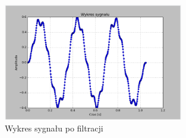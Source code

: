 \documentclass{article}
\begin{document}
{{            \begin{figure}[h!]
                \centering
                \includegraphics[width=0.7\textwidth]{img/fil14.png}
                \caption{Wykres sygnału po filtracji}
            \end{figure}
            \FloatBarrier
        }
        \newpage

}
\end{document}
